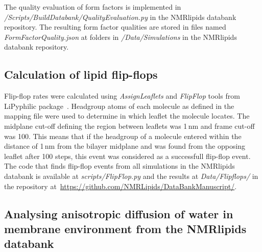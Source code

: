 \documentclass[fleqn,10pt]{wlscirep}
\begin{document}
The quality evaluation of form factors is implemented in {\it /Scripts/BuildDatabank/QualityEvaluation.py} in the NMRlipids databank repository. The resulting form factor qualities are stored in files named {\it FormFactorQuality.json} at folders in {\it /Data/Simulations} in the NMRlipids databank repository.


\subsection{Calculation of lipid flip-flops}
Flip-flop rates were calculated using {\it AssignLeaflets} and {\it FlipFlop} tools from LiPyphilic package~\cite{LiPyphilic2021}. Headgroup atoms of each molecule as defined in the mapping file were used to determine in which leaflet the molecule locates. The midplane cut-off defining the region between leaflets was 1\,nm and frame cut-off was 100. This means that if the headgroup of a molecule entered within the distance of 1\,nm from the bilayer midplane and was found from the opposing leaflet after 100 steps, this event was considered as a successfull flip-flop event. The code that finds flip-flop events from all simulations in the NMRlipids databank is available at {\it scripts/FlipFlop.py} and the results at {\it Data/Flipflops/} in the repository at~\url{https://github.com/NMRLipids/DataBankManuscript/}. 


\subsection{Analysing anisotropic diffusion of water in membrane environment from the NMRlipids databank}


\end{document}
